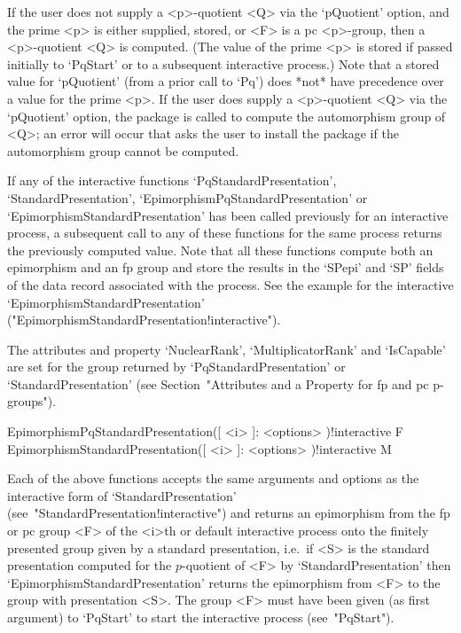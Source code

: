 If  the user  does  not supply  a  <p>-quotient <Q>  via the  `pQuotient'
option, and  the prime  <p> is either  supplied, stored,  or <F> is  a pc
<p>-group, then a  <p>-quotient <Q> is computed. (The  value of the prime
<p>  is  stored if  passed  initially to  `PqStart'  or  to a  subsequent
interactive process.)  Note that a  stored value for `pQuotient'  (from a
prior call to `Pq') does *not* have precedence over a value for the prime
<p>.  If the  user does  supply a  <p>-quotient <Q>  via  the `pQuotient'
option,  the package  {\AutPGrp} is  called to  compute  the automorphism
group  of <Q>; an  error will  occur that  asks the  user to  install the
package {\AutPGrp} if the automorphism group cannot be computed.

If   any   of   the   interactive   functions   `PqStandardPresentation',
`StandardPresentation',      `EpimorphismPqStandardPresentation'       or
`EpimorphismStandardPresentation'  has  been  called  previously  for  an
interactive process, a subsequent call to any of these functions for  the
same process returns the previously computed value. Note that  all  these
functions compute both an epimorphism and  an  fp  group  and  store  the
results in the `SPepi' and `SP' fields of the data record associated with
the    process.    See    the     example     for     the     interactive
`EpimorphismStandardPresentation'
("EpimorphismStandardPresentation!interactive").

The  attributes  and  property  `NuclearRank',  `MultiplicatorRank'   and
`IsCapable' are set for the group returned by `PqStandardPresentation' or
`StandardPresentation' (see Section~"Attributes and a Property for fp and  
pc p-groups").

\>EpimorphismPqStandardPresentation([ <i> ]: <options> )!{interactive} F
\>EpimorphismStandardPresentation([ <i> ]: <options> )!{interactive} M

Each of the above functions accepts the same arguments and options as the
interactive           form           of            `StandardPresentation'
(see~"StandardPresentation!interactive") and returns an epimorphism  from
the fp or pc group <F> of  the  <i>th  or  default  interactive  {\ANUPQ}
process  onto  the  finitely  presented  group  given   by   a   standard
presentation, i.e.~if <S> is the standard presentation computed  for  the
$p$-quotient     of     <F>      by      `StandardPresentation'      then
`EpimorphismStandardPresentation' returns the epimorphism from <F> to the
group with presentation <S>. The group <F> must have been given (as first
argument)  to  `PqStart'  to  start  the  interactive  {\ANUPQ}   process
(see~"PqStart").

